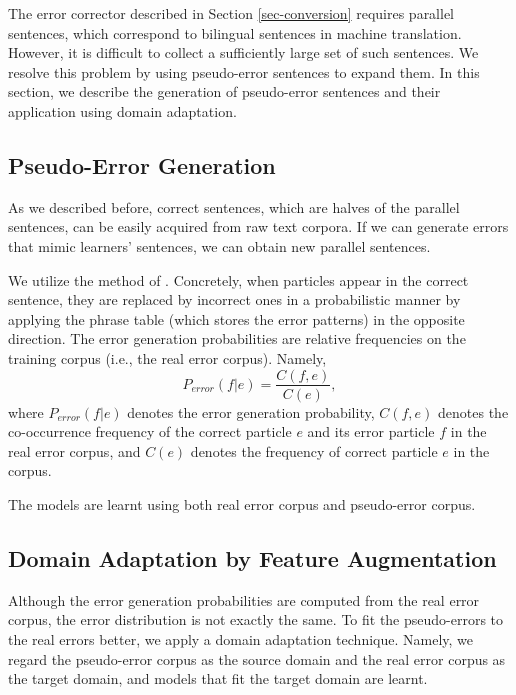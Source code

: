 \documentclass[english]{jnlp_1.4_rep}
\begin{document}
The error corrector described in Section \ref{sec-conversion} requires
parallel sentences, which correspond to bilingual sentences in machine
translation. However, it is difficult to collect a sufficiently large
set of such sentences. We resolve this problem by using pseudo-error
sentences to expand them. In this section, we describe the generation
of pseudo-error sentences and their application using domain
adaptation.


\subsection{Pseudo-Error Generation}

As we described before, correct sentences, which are halves of the
parallel sentences, can be easily acquired from raw text corpora.  If we
can generate errors that mimic learners' sentences, we can obtain new
parallel sentences.


We utilize the method of
. Concretely, when particles
appear in the correct sentence, they are replaced by incorrect ones in
a probabilistic manner by applying the phrase table (which stores the
error patterns) in the opposite direction.  The error generation
probabilities are relative frequencies on the training corpus (i.e.,
the real error corpus). Namely,
\begin{equation}
P_{\mathit{error}}(f|e)  =  \frac{C(f,e)}{C(e)},
\end{equation}
where $P_{\mathit{error}}(f|e)$ denotes the error generation probability,
$C(f,e)$ denotes the co-occurrence frequency of the correct particle
$e$ and its error particle $f$ in the real error corpus, and $C(e)$
denotes the frequency of correct particle $e$ in the corpus.

The models are learnt using both real error corpus and pseudo-error
corpus.


\subsection{Domain Adaptation by Feature Augmentation}
\label{sec-domain-adaptation}

Although the error generation probabilities are computed from the real
error corpus, the error distribution is not exactly the same. To fit
the pseudo-errors to the real errors better, we apply a domain
adaptation technique. Namely, we regard the pseudo-error corpus as the
source domain and the real error corpus as the target domain, and
models that fit the target domain are learnt.
\end{document}
